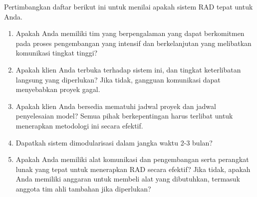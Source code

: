 Pertimbangkan daftar berikut ini untuk menilai apakah sistem RAD tepat untuk Anda.\cite{codebots}

\begin{enumerate}
    \item Apakah Anda memiliki tim yang berpengalaman yang dapat berkomitmen pada proses pengembangan yang intensif dan berkelanjutan yang melibatkan komunikasi tingkat tinggi?
    \item Apakah klien Anda terbuka terhadap sistem ini, dan tingkat keterlibatan langsung yang diperlukan? Jika tidak, gangguan komunikasi dapat menyebabkan proyek gagal.
    \item Apakah klien Anda bersedia mematuhi jadwal proyek dan jadwal penyelesaian model? Semua pihak berkepentingan harus terlibat untuk menerapkan metodologi ini secara efektif.
    \item Dapatkah sistem dimodularisasi dalam jangka waktu 2-3 bulan?
    \item Apakah Anda memiliki alat komunikasi dan pengembangan serta perangkat lunak yang tepat untuk menerapkan RAD secara efektif? Jika tidak, apakah Anda memiliki anggaran untuk membeli alat yang dibutuhkan, termasuk anggota tim ahli tambahan jika diperlukan?
\end{enumerate}